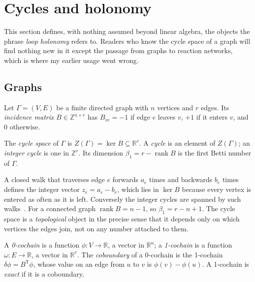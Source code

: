 \section{Cycles and holonomy}
\label{c1:sec-holonomy}

This section defines, with nothing assumed beyond linear algebra, the
objects the phrase \emph{loop holonomy} refers to. Readers who know the
cycle space of a graph will find nothing new in it except the passage from
graphs to reaction networks, which is where my earlier usage went wrong.

\subsection{Graphs}

Let $\Gamma=(V,E)$ be a finite directed graph with $n$ vertices and $r$
edges. Its \emph{incidence matrix} $B\in\mathbb Z^{n\times r}$ has $B_{ve}=-1$
if edge $e$ leaves $v$, $+1$ if it enters $v$, and $0$ otherwise.

\begin{definition}
\label{c1:def-cycles}
The \emph{cycle space} of $\Gamma$ is $Z(\Gamma)=\ker B\subseteq\mathbb R^r$.
A \emph{cycle} is an element of $Z(\Gamma)$; an \emph{integer cycle} is one in
$\mathbb Z^r$. Its dimension $\beta_1=r-\operatorname{rank}B$ is the first
Betti number of $\Gamma$.
\end{definition}

A closed walk that traverses edge $e$ forwards $a_e$ times and backwards
$b_e$ times defines the integer vector $z_e=a_e-b_e$, which lies in $\ker B$
because every vertex is entered as often as it is left. Conversely the
integer cycles are spanned by such walks~\citep{biggs1993}. For a connected
graph $\operatorname{rank}B=n-1$, so $\beta_1=r-n+1$. \lnkS{} The cycle
space is a \emph{topological} object in the precise sense that it depends
only on which vertices the edges join, not on any number attached to them.

\begin{definition}
\label{c1:def-cochain}
A \emph{0-cochain} is a function $\phi:V\to\mathbb R$, a vector in
$\mathbb R^n$; a \emph{1-cochain} is a function $\omega:E\to\mathbb R$, a
vector in $\mathbb R^r$. The \emph{coboundary} of a 0-cochain is the
1-cochain $\delta\phi=B^{\mathsf T}\phi$, whose value on an edge from $u$ to
$v$ is $\phi(v)-\phi(u)$. A 1-cochain is \emph{exact} if it is a coboundary.
\end{definition}

